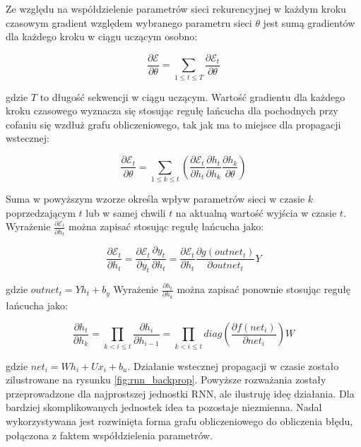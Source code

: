 \documentclass[oneside, mag]{mgr}
\begin{document}
Ze względu na współdzielenie parametrów sieci rekurencyjnej w każdym kroku czasowym gradient względem wybranego parametru sieci $\theta$ jest sumą gradientów dla każdego kroku w ciągu uczącym osobno:

\begin{equation}
	\frac{\partial \mathcal{E}}{\partial \theta} = \sum_{1 \leq t \leq T} \frac{\partial \mathcal{E}_t}{\partial \theta}
\end{equation}

gdzie $T$ to długość sekwencji w ciągu uczącym. Wartość gradientu dla każdego kroku czasowego wyznacza się stosując regułę łańcucha dla pochodnych przy cofaniu się wzdłuż grafu obliczeniowego, tak jak ma to miejsce dla propagacji wstecznej:

\begin{equation}
	\frac{\partial \mathcal{E}_t}{\partial \theta} = \sum_{1 \leq k \leq t} (\frac{\partial \mathcal{E}_t}{\partial h_t} \frac{\partial h_t}{\partial h_k} \frac{\partial h_k}{\partial \theta})
\end{equation}

Suma w powyższym wzorze określa wpływ parametrów sieci w czasie $k$ poprzedzającym $t$ lub w samej chwili $t$ na aktualną wartość wyjścia w czasie $t$. Wyrażenie $\frac{\partial \mathcal{E}_t}{\partial h_t}$ można zapisać stosując regułę łańcucha jako:

\begin{equation}
	\frac{\partial \mathcal{E}_t}{\partial h_t} = \frac{\partial \mathcal{E}_t}{\partial y_t} \frac{\partial y_t}{\partial h_t} = \frac{\partial \mathcal{E}_t}{\partial h_t} \frac{\partial g(outnet_t)}{\partial outnet_t} Y
\end{equation}

gdzie $outnet_t = Y h_t + b_y$ Wyrażenie $\frac{\partial h_t}{\partial h_k}$ można zapisać ponownie stosując regułę łańcucha jako:

\begin{equation}
	\frac{\partial h_t}{\partial h_k} = \prod_{k < i \leq t} \frac{\partial h_i}{\partial h_{i-1}} = \prod_{k < i \leq t} diag( \frac{\partial f(net_i)}{\partial net_i}) W
\label{eq:BPTT_product}
\end{equation}

gdzie $net_i = W h_i + U x_i + b_u$. Działanie wstecznej propagacji w czasie zostało zilustrowane na rysunku \ref{fig:rnn_backprop}. Powyższe rozważania zostały przeprowadzone dla najprostszej jednostki RNN, ale ilustruję ideę działania. Dla bardziej skomplikowanych jednostek idea ta pozostaje niezmienna. Nadal wykorzystywana jest rozwinięta forma grafu obliczeniowego do obliczenia błędu, połączona z faktem współdzielenia parametrów. 
\end{document}
